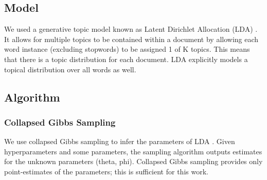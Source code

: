 


\subsection {Model}
We used a generative topic model known as Latent Dirichlet Allocation (LDA) \cite{Blei:2003:LDA:944919.944937}. It allows for multiple topics to be contained within a document by allowing each word instance (excluding stopwords) to be assigned 1 of K topics. This means that there is a topic distribution for each document. LDA explicitly models a topical distribution over all words as well. %

\subsection {Algorithm}

\subsubsection{Collapsed Gibbs Sampling}
We use collapsed Gibbs sampling to infer the parameters of LDA \cite{Blei:2003:LDA:944919.944937}. Given hyperparameters and some parameters, the sampling algorithm outputs estimates for the unknown parameters (theta, phi). Collapsed Gibbs sampling provides only point-estimates of the parameters; this is sufficient for this work. 

